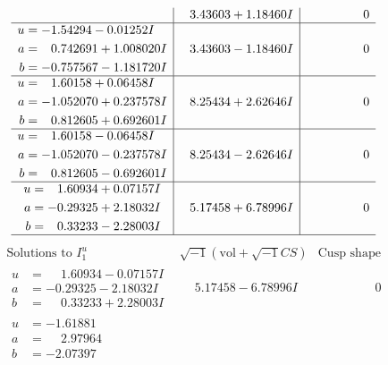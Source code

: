 \documentclass[1p]{elsarticle_modified}
\theoremstyle{definition}
\newcommand{\I}{\sqrt{-1}}
\begin{document}
$$\begin{array}{c|c|c}
 & \phantom{-}3.43603 + 1.18460 I & \phantom{-0.000000 } 0 \\ \hline\begin{aligned}
u &= -1.54294 - 0.01252 I \\
a &= \phantom{-}0.742691 + 1.008020 I \\
b &= -0.757567 - 1.181720 I\end{aligned}
 & \phantom{-}3.43603 - 1.18460 I & \phantom{-0.000000 } 0 \\ \hline\begin{aligned}
u &= \phantom{-}1.60158 + 0.06458 I \\
a &= -1.052070 + 0.237578 I \\
b &= \phantom{-}0.812605 + 0.692601 I\end{aligned}
 & \phantom{-}8.25434 + 2.62646 I & \phantom{-0.000000 } 0 \\ \hline\begin{aligned}
u &= \phantom{-}1.60158 - 0.06458 I \\
a &= -1.052070 - 0.237578 I \\
b &= \phantom{-}0.812605 - 0.692601 I\end{aligned}
 & \phantom{-}8.25434 - 2.62646 I & \phantom{-0.000000 } 0 \\ \hline\begin{aligned}
u &= \phantom{-}1.60934 + 0.07157 I \\
a &= -0.29325 + 2.18032 I \\
b &= \phantom{-}0.33233 - 2.28003 I\end{aligned}
 & \phantom{-}5.17458 + 6.78996 I & \phantom{-0.000000 } 0\\
 \hline 
 \end{array}$$\newpage$$\begin{array}{c|c|c}  
\text{Solutions to }I^u_{1}& \I (\text{vol} + \sqrt{-1}CS) & \text{Cusp shape}\\
 \hline 
\begin{aligned}
u &= \phantom{-}1.60934 - 0.07157 I \\
a &= -0.29325 - 2.18032 I \\
b &= \phantom{-}0.33233 + 2.28003 I\end{aligned}
 & \phantom{-}5.17458 - 6.78996 I & \phantom{-0.000000 } 0 \\ \hline\begin{aligned}
u &= -1.61881\phantom{ +0.000000I} \\
a &= \phantom{-}2.97964\phantom{ +0.000000I} \\
b &= -2.07397\phantom{ +0.000000I}\end{aligned}

\end{array}$$
\end{document}
